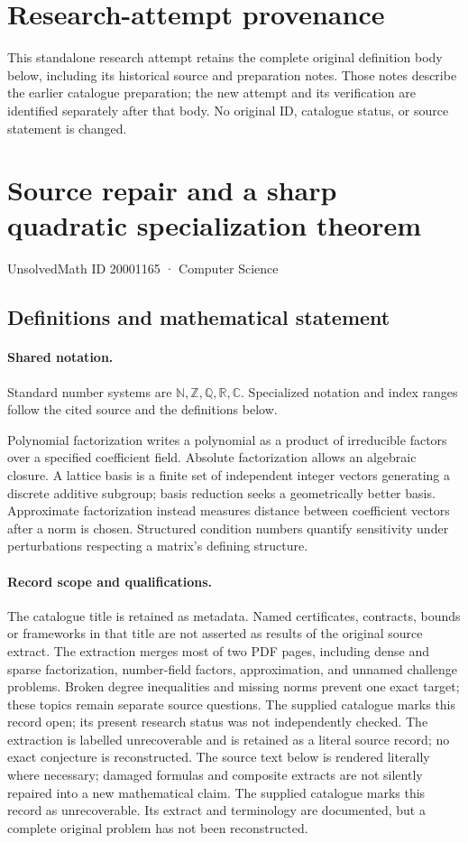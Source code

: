 \documentclass[11pt]{article}
\begin{document}
\section*{Research-attempt provenance}
This standalone research attempt retains the complete original definition body below,
including its historical source and preparation notes. Those notes describe the
earlier catalogue preparation; the new attempt and its verification are identified
separately after that body. No original ID, catalogue status, or source statement is changed.

\section{Source repair and a sharp quadratic specialization theorem}\label{20001165}
{\small UnsolvedMath ID 20001165 · Computer Science}
\subsection{Definitions and mathematical statement}

\paragraph{Shared notation.}Standard number systems are $\mathbb N,\mathbb Z,\mathbb Q,\mathbb R,\mathbb C$. Specialized notation and index ranges follow the cited source and the definitions below.


Polynomial factorization writes a polynomial as a product of irreducible factors over a specified coefficient field. Absolute factorization allows an algebraic closure. A lattice basis is a finite set of independent integer vectors generating a discrete additive subgroup; basis reduction seeks a geometrically better basis. Approximate factorization instead measures distance between coefficient vectors after a norm is chosen. Structured condition numbers quantify sensitivity under perturbations respecting a matrix's defining structure.
\paragraph{Record scope and qualifications.}
The catalogue title is retained as metadata. Named certificates, contracts, bounds or frameworks in that title are not asserted as results of the original source extract.
The extraction merges most of two PDF pages, including dense and sparse factorization, number-field factors, approximation, and unnamed challenge problems. Broken degree inequalities and missing norms prevent one exact target; these topics remain separate source questions. The supplied catalogue marks this record open; its present research status was not independently checked. The extraction is labelled unrecoverable and is retained as a literal source record; no exact conjecture is reconstructed.
The source text below is rendered literally where necessary; damaged formulas and composite extracts are not silently repaired into a new mathematical claim.
The supplied catalogue marks this record as unrecoverable. Its extract and terminology are documented, but a complete original problem has not been reconstructed.
\end{document}
